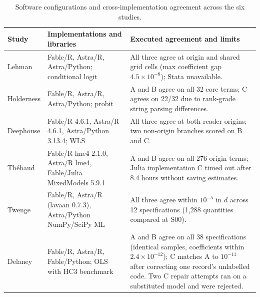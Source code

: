 \documentclass[11pt]{article}
\begin{document}
\begin{table}[H]\centering\small
\begin{tabularx}{\linewidth}{@{}lYY@{}}\toprule
Study & Implementations and libraries & Executed agreement and limits\\\midrule
Lehman & Fable/R, Astra/R, Astra/Python; conditional logit & All three agree at origin and shared grid cells (max coefficient gap $4.5\times10^{-8}$); Stata unavailable.\\
Holderness & Fable/R, Astra/R, Astra/Python; probit & A and B agree on all 32 core terms; C agrees on 22/32 due to rank-grade string parsing differences.\\
Deephouse & Fable/R 4.6.1, Astra/R 4.6.1, Astra/Python 3.13.4; WLS & All three agree at both reader origins; two non-origin branches scored on B and C.\\
Th\'ebaud & Fable/R lme4 2.1.0, Astra/R lme4, Fable/Julia MixedModels 5.9.1 & A and B agree on all 276 origin terms; Julia implementation C timed out after 8.4 hours without saving estimates.\\
Twenge & Fable/R, Astra/R (lavaan 0.7.3), Astra/Python NumPy/SciPy ML & All three agree within $10^{-5}$ in $d$ across 12 specifications (1,288 quantities compared at S00).\\
Delaney & Fable/R, Astra/R, Fable/Python; OLS with HC3 benchmark & A and B agree on all 38 specifications (identical samples, coefficients within $2.4\times10^{-12}$); C matches A to $10^{-11}$ after correcting one record's unlabelled code. Two C repair attempts ran on a substituted model and were rejected.\\\bottomrule
\end{tabularx}\caption{Software configurations and cross-implementation agreement across the six studies.}\end{table}
\end{document}
